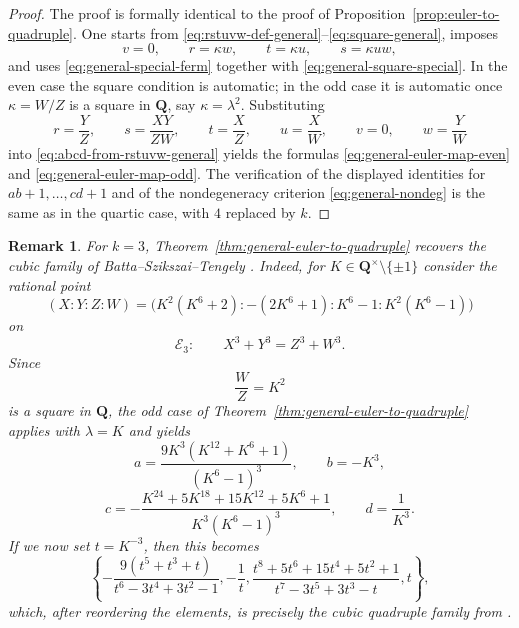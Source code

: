 \documentclass[11pt]{article}
\newtheorem{remark}[theorem]{Remark}
\newcommand{\Q}{\mathbf{Q}}
\begin{document}
\begin{proof}
The proof is formally identical to the proof of Proposition~\ref{prop:euler-to-quadruple}. 
One starts from \eqref{eq:rstuvw-def-general}--\eqref{eq:square-general}, imposes
\[
v=0,\qquad r=\kappa w,\qquad t=\kappa u,\qquad s=\kappa uw,
\]
and uses \eqref{eq:general-special-ferm} together with \eqref{eq:general-square-special}. 
In the even case the square condition is automatic; in the odd case it is automatic once $\kappa=W/Z$ is a square in $\Q$, say $\kappa=\lambda^2$. 
Substituting
\[
r=\frac{Y}{Z},\qquad s=\frac{XY}{ZW},\qquad t=\frac{X}{Z},\qquad u=\frac{X}{W},\qquad v=0,\qquad w=\frac{Y}{W}
\]
into \eqref{eq:abcd-from-rstuvw-general} yields the formulas
\eqref{eq:general-euler-map-even} and \eqref{eq:general-euler-map-odd}. 
The verification of the displayed identities for $ab+1,\dots,cd+1$ and of the nondegeneracy criterion \eqref{eq:general-nondeg} is the same as in the quartic case, with $4$ replaced by $k$.
\end{proof}

\begin{remark}
For $k=3$, Theorem~\ref{thm:general-euler-to-quadruple} recovers the cubic family of Batta--Szikszai--Tengely \cite{BST}. Indeed, for $K\in\Q^\times\setminus\{\pm1\}$ consider the rational point
\[
(X:Y:Z:W)=\bigl(K^2(K^6+2):-(2K^6+1):K^6-1:K^2(K^6-1)\bigr)
\]
on
\[
\mathcal E_3:\qquad X^3+Y^3=Z^3+W^3.
\]
Since
\[
\frac{W}{Z}=K^2
\]
is a square in $\Q$, the odd case of Theorem~\ref{thm:general-euler-to-quadruple} applies with $\lambda=K$ and yields
\[
a=\frac{9K^3(K^{12}+K^6+1)}{(K^6-1)^3},\qquad
b=-K^3,
\]
\[
c=-\frac{K^{24}+5K^{18}+15K^{12}+5K^6+1}{K^3(K^6-1)^3},\qquad
d=\frac1{K^3}.
\]
If we now set $t=K^{-3}$, then this becomes
\[
\left\{
-\frac{9(t^5+t^3+t)}{t^6-3t^4+3t^2-1},
-\frac1t,
\frac{t^8+5t^6+15t^4+5t^2+1}{t^7-3t^5+3t^3-t},
t
\right\},
\]
which, after reordering the elements, is precisely the cubic quadruple family from \cite[Theorem~4.11]{BST}.
\end{remark}
\end{document}
